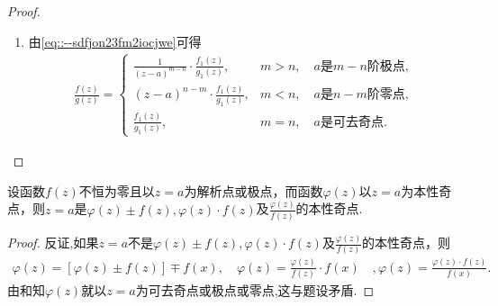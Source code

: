\documentclass[../../main.tex]{subfiles}%
\begin{document}
\begin{proof}
\begin{enumerate}[(1)]
\item 由\eqref{eq::--sdfjon23fm2iocjwe}可得
\begin{align*}
\frac{f(z)}{g(z)}=
\begin{cases}
\frac{1}{(z-a)^{m-n}}\cdot\frac{f_1(z)}{g_1(z)},&m>n,\quad a\text{是}m-n\text{阶极点},\\
(z-a)^{n-m}\cdot\frac{f_1(z)}{g_1(z)},&m<n,\quad a\text{是}n-m\text{阶零点},\\
\frac{f_1(z)}{g_1(z)},&m=n,\quad a\text{是可去奇点}.
\end{cases}
\end{align*}
\end{enumerate}
\end{proof}

\begin{proposition}\label{proposition:本性奇点的积和差商仍是本性奇点}
设函数$f(z)$不恒为零且以$z=a$为解析点或极点，而函数$\varphi(z)$以$z=a$为本性奇点，则$z=a$是$\varphi(z)\pm f(z),\varphi(z)\cdot f(z)$及$\frac{\varphi(z)}{f(z)}$的本性奇点.
\end{proposition}
\begin{proof}
反证,如果$z=a$不是$\varphi(z)\pm f(z),\varphi(z)\cdot f(z)$及$\frac{\varphi(z)}{f(z)}$的本性奇点，则
\begin{align*}
\varphi (z)=\left[ \varphi (z)\pm f(z) \right] \mp f\left( x \right) ,\quad \varphi (z)=\frac{\varphi (z)}{f(z)}\cdot f\left( x \right) \quad ,\varphi (z)=\frac{\varphi (z)\cdot f(z)}{f\left( x \right)}.
\end{align*}
由和知$\varphi(z)$就以$z=a$为可去奇点或极点或零点,这与题设矛盾.
\end{proof}
\end{document}
